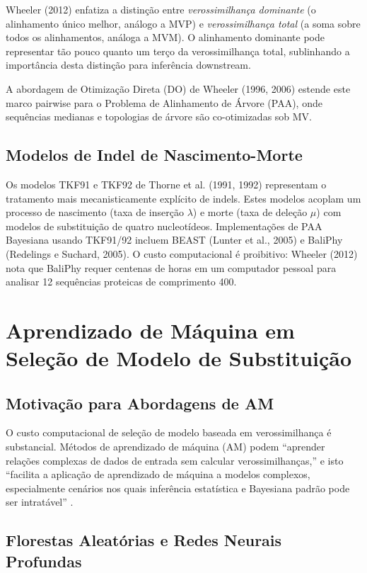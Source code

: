 Wheeler (2012) enfatiza a distinção entre \textit{verossimilhança dominante} (o alinhamento único melhor, análogo a MVP) e \textit{verossimilhança total} (a soma sobre todos os alinhamentos, análoga a MVM). O alinhamento dominante pode representar tão pouco quanto um terço da verossimilhança total, sublinhando a importância desta distinção para inferência downstream.

A abordagem de Otimização Direta (DO) de Wheeler (1996, 2006) estende este marco pairwise para o Problema de Alinhamento de Árvore (PAA), onde sequências medianas e topologias de árvore são co-otimizadas sob MV.

\subsection{Modelos de Indel de Nascimento-Morte}

Os modelos TKF91 e TKF92 de Thorne et al. (1991, 1992) representam o tratamento mais mecanisticamente explícito de indels. Estes modelos acoplam um processo de nascimento (taxa de inserção $\lambda$) e morte (taxa de deleção $\mu$) com modelos de substituição de quatro nucleotídeos. Implementações de PAA Bayesiana usando TKF91/92 incluem BEAST (Lunter et al., 2005) e BaliPhy (Redelings e Suchard, 2005). O custo computacional é proibitivo: Wheeler (2012) nota que BaliPhy requer centenas de horas em um computador pessoal para analisar 12 sequências proteicas de comprimento 400.

\section{Aprendizado de Máquina em Seleção de Modelo de Substituição}

\subsection{Motivação para Abordagens de AM}

O custo computacional de seleção de modelo baseada em verossimilhança é substancial. Métodos de aprendizado de máquina (AM) podem ``aprender relações complexas de dados de entrada sem calcular verossimilhanças,'' e isto ``facilita a aplicação de aprendizado de máquina a modelos complexos, especialmente cenários nos quais inferência estatística e Bayesiana padrão pode ser intratável'' \parencite{mo2024}.

\subsection{Florestas Aleatórias e Redes Neurais Profundas}

